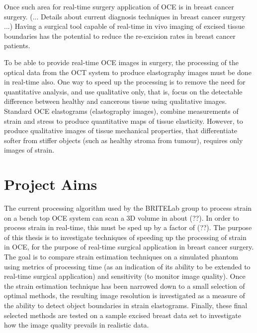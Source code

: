 Once such area for real-time surgery application of OCE is in breast cancer surgery. (... Details about current diagnosis techniques in breast cancer surgery ...) Having a surgical tool capable of real-time in vivo imaging of excised tissue boundaries has the potential to reduce the re-excision rates in breast cancer patients.

To be able to provide real-time OCE images in surgery, the processing of the optical data from the OCT system to produce elastography images must be done in real-time also. One way to speed up the processing is to remove the need for quantitative analysis, and use qualitative only, that is, focus on the detectable difference between healthy and cancerous tissue using qualitative images. Standard OCE elastograms (elastography images), combine measurements of strain and stress to produce quantitative maps of tissue elasticity. However, to produce qualitative images of tissue mechanical properties, that differentiate softer from stiffer objects (such as healthy stroma from tumour), requires only images of strain. 

\section{Project Aims}

The current processing algorithm used by the BRITELab group to process strain on a bench top OCE system can scan a 3D volume in about (??). In order to process strain in real-time, this must be sped up by a factor of (??). The purpose of this thesis is to investigate techniques of speeding up the processing of strain in OCE, for the purpose of real-time surgical application in breast cancer surgery. The goal is to compare strain estimation techniques on a simulated phantom using metrics of processing time (as an indication of its ability to be extended to real-time surgical application) and sensitivity (to monitor image quality). Once the strain estimation technique has been narrowed down to a small selection of optimal methods, the resulting image resolution is investigated as a measure of the ability to detect object boundaries in strain elastograms. Finally, these final selected methods are tested on a sample excised breast data set to investigate how the image quality prevails in realistic data.
